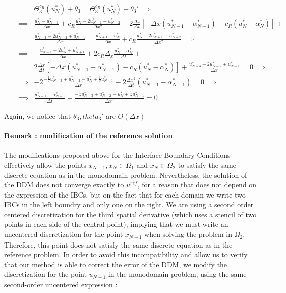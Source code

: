 \begin{align*}
\label{eq:modifiedTBC3}
&&  &\Theta_3^{c_R}(u_N^*) + \theta_3 = \Theta_3^{c_R}(u_N^*) + \theta_3'     \implies \\
&& \implies & \frac{u_N^* - u_{N-1}^*}{\Delta x} + c_R \frac{u_N^* - 2u_{N-1}^* + u_{N-2}^*}{\Delta x^2} + 2\frac{\Delta x}{\Delta t}  \left[-\Delta x(u_{N-1}^* - \alpha_{N-1}^*) - c_R (u_N^* - \alpha_N^*) \right] + \\
&&   & 			\frac{u_{N-3}^* - 2u_{N-2}^* + u_{N-1}^*}{\Delta x}  =  \frac{u_{N+1}^* - u_{N}^*}{\Delta x} + c_R \frac{u_N^* - 2u_{N+1}^* + u_{N+2}^*}{\Delta x^2} \implies \\
&&  \implies &  -\frac{u_{N-1}^* - 2 u_{N}^* + u_{N+1}^*}{\Delta x} + 2c_R\Delta_x\frac{u_N^* - \alpha_N^*}{\Delta t} + \\
&&   & 2\frac{\Delta x}{\Delta t} \left[-\Delta x(u_{N-1}^* - \alpha_{N-1}^*) - c_R(u_N^* - \alpha_N^*) \right] + \frac{u_{N-3}^* - 2u_{N-2}^* + u_{N-1}^*}{\Delta x} = 0 \implies \\
&& \implies  & -2\frac{-\frac{1}{2}u_{N-3}^* + u_{N-2}^* - u_{N}^* + \frac{1}{2}u_{N+1}^* }{\Delta x} - 2\frac{\Delta x^2}{\Delta t}(u_{N-1}^* - 					\alpha_{N-1}^*) = 0 \implies \\
&& \implies &  \frac{u_{N-1}^* - \alpha_{N-1}^*}{\Delta t} + \frac{-\frac{1}{2}u_{N-3}^* + u_{N-2}^* - u_{N}^* + \frac{1}{2}u_{N+1}^* }{\Delta x ^3} = 0
\end{align*}

\indent Again, we notice that $\theta_3,theta_3'$ are $O(\Delta x)$

\paragraph{Remark : modification of the reference solution}

\indent The modifications proposed above for the Interface Boundary Conditions effectively allow the points $x_{N-1},x_N \in \Omega_1$ and $x_N \in \Omega_2$ to satisfy the same discrete equation as in the monodomain problem. Nevertheless, the solution of the DDM does not converge exactly to $u^{ref}$, for a reason that does not depend on the expression of the IBCs, but on the fact that for each domain we write two IBCs in the left boundry and only one on the right. We are using a second order centered discretization for the third spatial derivative (which uses a stencil of two points in each side of the central point), implying that we must write an uncentered discretization for the point $x_{N+1}$ when solving the problem in $\Omega_2$. Therefore, this point does not satisfy the same discrete equation as in the reference problem. In order to avoid this incompatibility and allow us to verify that our method is able to correct the error of the DDM, we modify the discretization for the point $u_{N+1}$ in the monodomain problem, using the same second-order uncentered expression :

